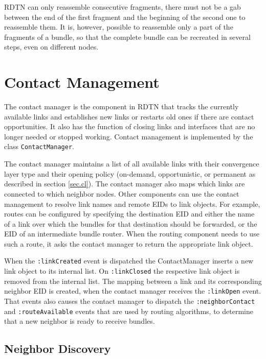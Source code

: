 \documentclass[a4paper]{article}
\begin{document}
RDTN can only reassemble consecutive fragments, there must not be a gab
between the end of the first fragment and the beginning of the second one to
reassemble them. It is, however, possible to reassemble only a part of the
fragments of a bundle, so that the complete bundle can be recreated in several
steps, even on different nodes.

\section{Contact Management}\label{sec.contact-mngt}

The contact manager is the component in RDTN that tracks the currently available
links and establishes new links or restarts old ones if there are contact
opportunities. It also has the function of closing links and
interfaces that are no longer needed or stopped working. Contact management is
implemented by the class {\tt ContactManager}.

The contact manager maintains a list of all available links with their
convergence layer type and their opening policy (on-demand, opportunistic, or
permanent as described in section \ref{sec.cl}). The contact manager also maps
which links are connected to which neighbor nodes. Other components can use the
contact management to resolve link names and remote EIDs to link objects. For
example, routes can be configured by specifying the destination EID and either
the name of a link over which the bundles for that destination should be
forwarded, or the EID of an intermediate bundle router. When the routing
component needs to use such a route, it asks the contact manager to return the
appropriate link object.

When the {\tt :linkCreated} event is dispatched the ContactManager inserts a new
link object to its internal list.  On {\tt :linkClosed} the respective link
object is removed from the internal list. The mapping between a link and its
corresponding neighbor EID is created, when the contact manager receives the
{\tt :linkOpen} event. That events also causes the contact manager to dispatch
the {\tt :neighborContact} and {\tt :routeAvailable} events that are used by
routing algorithms, to determine that a new neighbor is ready to receive
bundles.

\subsection{Neighbor Discovery}\label{sec.discovery}
\end{document}
